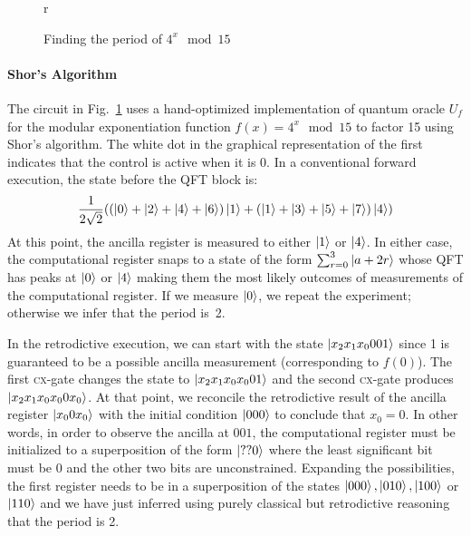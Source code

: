 \documentclass[sigplan,review]{acmart}
\newcommand{\cx}{\textsc{cx}}
\begin{document}
\begin{figure}{r}
\begin{center}
\end{center}
\caption{\label{fig:shor15}Finding the period of $4^x \mod{15}$}
\end{figure}
\paragraph*{Shor's Algorithm}
The circuit in Fig.~\ref{fig:shor15} uses a hand-optimized
implementation of quantum oracle $U_f$ for the modular exponentiation
function $f(x) = 4^x \mod{15}$ to factor 15 using Shor's
algorithm. The white dot in the graphical representation of the first
indicates that the control is active when it is 0. In a conventional
forward execution, the state before the QFT block is:
\[
\frac{1}{2\sqrt{2}} (
  (\ket{0} + \ket{2} + \ket{4} + \ket{6}) \ket{1} + 
  (\ket{1} + \ket{3} + \ket{5} + \ket{7}) \ket{4}
  )
\]
At this point, the ancilla register is measured to either $\ket{1}$ or
$\ket{4}$. In either case, the computational register snaps to a state
of the form $\sum_{r=0}^3 \ket{a+2r}$ whose QFT has peaks at $\ket{0}$
or $\ket{4}$ making them the most likely outcomes of measurements of
the computational register. If we measure $\ket{0}$, we repeat the
experiment; otherwise we infer that the period is~2.

In the retrodictive execution, we can start with the state
$\ket{x_2x_1x_0001}$ since 1 is guaranteed to be a possible ancilla
measurement (corresponding to $f(0)$). The first \cx-gate changes the
state to $\ket{x_2x_1x_0x_001}$ and the second \cx-gate produces
$\ket{x_2x_1x_0x_00x_0}$. At that point, we reconcile the retrodictive
result of the ancilla register $\ket{x_00x_0}$ with the initial
condition $\ket{000}$ to conclude that $x_0=0$. In other words, in
order to observe the ancilla at $001$, the computational register must
be initialized to a superposition of the form $\ket{??0}$ where the
least significant bit must be 0 and the other two bits are
unconstrained. Expanding the possibilities, the first register needs
to be in a superposition of the states $\ket{000}, \ket{010},
\ket{100}$ or $\ket{110}$ and we have just inferred using purely
classical but retrodictive reasoning that the period is
2.
\end{document}
